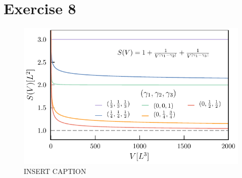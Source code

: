\documentclass{article}
\begin{document}
\section{Exercise 8}

\begin{figure}[h!]
  \includegraphics[width=\linewidth]{Q08/minecraftConvergence.pdf}
  \caption{INSERT CAPTION}
  \label{fig:minecraftConvergence}
\end{figure}
\end{document}
